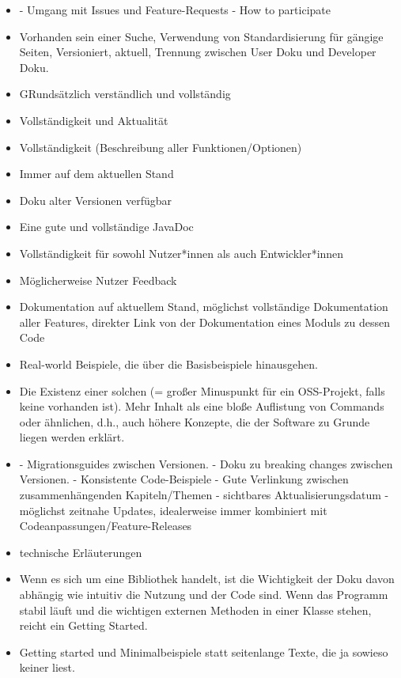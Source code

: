 \begin{multicols}{2}
\begin{itemize}
        \item - Umgang mit Issues und Feature-Requests
              - How to participate
        \item Vorhanden sein einer Suche, Verwendung von Standardisierung für gängige Seiten, Versioniert, aktuell, Trennung zwischen User Doku und Developer Doku.
        \item GRundsätzlich verständlich und vollständig
        \item Vollständigkeit und Aktualität
        \item Vollständigkeit (Beschreibung aller Funktionen/Optionen)
        \item Immer auf dem aktuellen Stand
        \item Doku alter Versionen verfügbar
        \item Eine gute und vollständige JavaDoc
        \item Vollständigkeit für sowohl Nutzer*innen als auch Entwickler*innen
        \item Möglicherweise Nutzer Feedback
        \item Dokumentation auf aktuellem Stand, möglichst vollständige Dokumentation aller Features, direkter Link von der Dokumentation eines Moduls zu dessen Code
        \item Real-world Beispiele, die über die Basisbeispiele hinausgehen.
        \item Die Existenz einer solchen (= großer Minuspunkt für ein OSS-Projekt, falls keine vorhanden ist). Mehr Inhalt als eine bloße Auflistung von Commands oder ähnlichen, d.h., auch höhere Konzepte, die der Software zu Grunde liegen werden erklärt.
        \item - Migrationsguides zwischen Versionen.
              - Doku zu breaking changes zwischen Versionen.
              - Konsistente Code-Beispiele
              - Gute Verlinkung zwischen zusammenhängenden Kapiteln/Themen
              - sichtbares Aktualisierungsdatum
              - möglichst zeitnahe Updates, idealerweise immer kombiniert mit Codeanpassungen/Feature-Releases
        \item technische Erläuterungen
        \item Wenn es sich um eine Bibliothek handelt, ist die Wichtigkeit der Doku davon abhängig wie intuitiv die Nutzung und der Code sind. Wenn das Programm stabil läuft und die wichtigen externen Methoden in einer Klasse stehen, reicht ein Getting Started.
        \item Getting started und Minimalbeispiele statt seitenlange Texte, die ja sowieso keiner liest.

\end{itemize}
\end{multicols}
